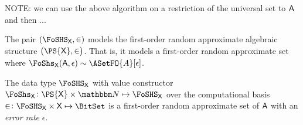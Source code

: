 \documentclass[ ../main.tex]{subfiles}
\begin{document}
NOTE: we can use the above algorithm on a restriction of the universal set to $\Set{A}$ and then ...

The pair $\left(\FoSHS_{\Set{X}}, \SetContains\right)$ models the first-order random approximate algebraic structure $\left(\PS{\Set{X}},\SetContains\right)$.
That is, it models a first-order random approximate set where $\FoShs_{\Set{X}}(\Set{A},\epsilon) \sim \ASetFO{A}[\epsilon]$.

\begin{theorem}
    The data type $\FoSHS_{\Set{X}}$ with value constructor $\FoShs_{\Set{X}} \colon \PS{\Set{X}} \times \NatSet \mapsto \FoSHS_{\Set{X}}$ over the computational basis $\SetContains \colon \FoSHS_{\Set{X}} \times \Set{X} \mapsto \BitSet$ is a first-order random approximate set of $\Set{A}$ with an \emph{error rate} $\epsilon$.
\end{theorem}
\end{document}
